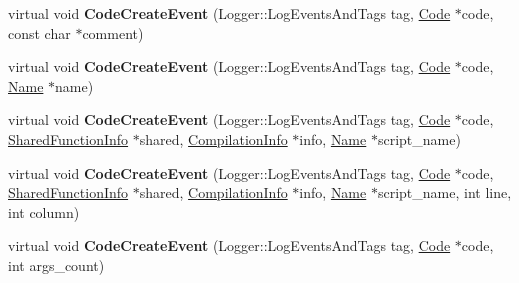 \begin{DoxyCompactItemize}
\item 
\hypertarget{classv8_1_1internal_1_1_cpu_profiler_ad002de6565ce9d12e4b6e1acdc3b8f1f}{}virtual void {\bfseries Code\+Create\+Event} (Logger\+::\+Log\+Events\+And\+Tags tag, \hyperlink{classv8_1_1internal_1_1_code}{Code} $\ast$code, const char $\ast$comment)\label{classv8_1_1internal_1_1_cpu_profiler_ad002de6565ce9d12e4b6e1acdc3b8f1f}

\item 
\hypertarget{classv8_1_1internal_1_1_cpu_profiler_a15312700903335ca7f3dab2548d5517b}{}virtual void {\bfseries Code\+Create\+Event} (Logger\+::\+Log\+Events\+And\+Tags tag, \hyperlink{classv8_1_1internal_1_1_code}{Code} $\ast$code, \hyperlink{classv8_1_1internal_1_1_name}{Name} $\ast$name)\label{classv8_1_1internal_1_1_cpu_profiler_a15312700903335ca7f3dab2548d5517b}

\item 
\hypertarget{classv8_1_1internal_1_1_cpu_profiler_a8792c746f0bcc66e6f78735eaf297219}{}virtual void {\bfseries Code\+Create\+Event} (Logger\+::\+Log\+Events\+And\+Tags tag, \hyperlink{classv8_1_1internal_1_1_code}{Code} $\ast$code, \hyperlink{classv8_1_1internal_1_1_shared_function_info}{Shared\+Function\+Info} $\ast$shared, \hyperlink{classv8_1_1internal_1_1_compilation_info}{Compilation\+Info} $\ast$info, \hyperlink{classv8_1_1internal_1_1_name}{Name} $\ast$script\+\_\+name)\label{classv8_1_1internal_1_1_cpu_profiler_a8792c746f0bcc66e6f78735eaf297219}

\item 
\hypertarget{classv8_1_1internal_1_1_cpu_profiler_a228cde2f07d62d796850ae8ca797fbff}{}virtual void {\bfseries Code\+Create\+Event} (Logger\+::\+Log\+Events\+And\+Tags tag, \hyperlink{classv8_1_1internal_1_1_code}{Code} $\ast$code, \hyperlink{classv8_1_1internal_1_1_shared_function_info}{Shared\+Function\+Info} $\ast$shared, \hyperlink{classv8_1_1internal_1_1_compilation_info}{Compilation\+Info} $\ast$info, \hyperlink{classv8_1_1internal_1_1_name}{Name} $\ast$script\+\_\+name, int line, int column)\label{classv8_1_1internal_1_1_cpu_profiler_a228cde2f07d62d796850ae8ca797fbff}

\item 
\hypertarget{classv8_1_1internal_1_1_cpu_profiler_a50504f240e6b66fdb5e9d0955896b554}{}virtual void {\bfseries Code\+Create\+Event} (Logger\+::\+Log\+Events\+And\+Tags tag, \hyperlink{classv8_1_1internal_1_1_code}{Code} $\ast$code, int args\+\_\+count)\label{classv8_1_1internal_1_1_cpu_profiler_a50504f240e6b66fdb5e9d0955896b554}


\end{DoxyCompactItemize}
